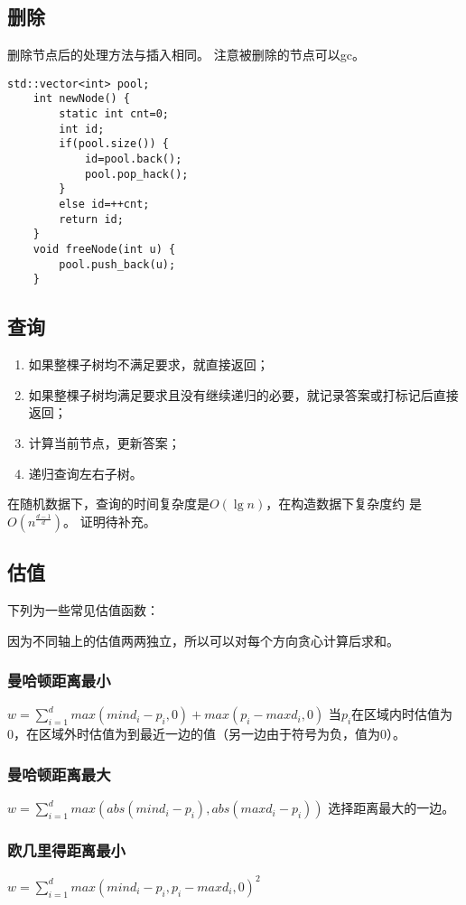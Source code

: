 \subsection{删除}
删除节点后的处理方法与插入相同。
注意被删除的节点可以gc。

\begin{lstlisting}[title=gc]
    std::vector<int> pool;
    int newNode() {
        static int cnt=0;
        int id;
        if(pool.size()) {
            id=pool.back();
            pool.pop_hack();
        }
        else id=++cnt;
        return id;
    }
    void freeNode(int u) {
        pool.push_back(u);
    }
\end{lstlisting}

\subsection{查询}
\begin{enumerate}
	\item 如果整棵子树均不满足要求，就直接返回；
	\item 如果整棵子树均满足要求且没有继续递归的必要，就记录答案或打标记后直接返回；
	\item 计算当前节点，更新答案；
	\item 递归查询左右子树。
\end{enumerate}
在随机数据下，查询的时间复杂度是$O(\lg n)$，在构造数据下复杂度约
是$O(n^\frac{d-1}{d})$。
证明待补充。
\subsection{估值}
下列为一些常见估值函数：

因为不同轴上的估值两两独立，所以可以对每个方向贪心计算后求和。
\subsubsection{曼哈顿距离最小}
$\displaystyle w=\sum_{i=1}^d{max(mind_i-p_i,0)+max(p_i-maxd_i,0)}$
当$p_i$在区域内时估值为0，在区域外时估值为到最近一边的值（另一边由于符号为负，值为0）。
\subsubsection{曼哈顿距离最大}
$\displaystyle w=\sum_{i=1}^d{max(abs(mind_i-p_i),abs(maxd_i-p_i))}$
选择距离最大的一边。
\subsubsection{欧几里得距离最小}
$\displaystyle w=\sum_{i=1}^d{max(mind_i-p_i,p_i-maxd_i,0)^2}$
